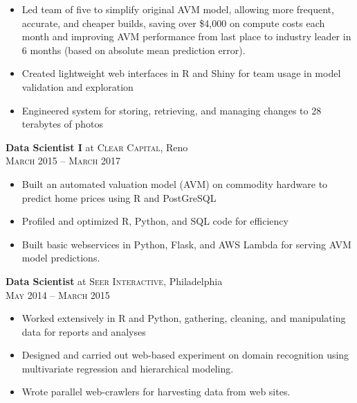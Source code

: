 \documentclass[a4paper,10pt]{article}
\begin{document}
\vspace{-5mm}
\small 
\begin{itemize}
    \item Led team of five to simplify original AVM model, allowing more frequent, accurate, and cheaper builds, saving over \$4,000 on compute costs each month and improving AVM performance from last place to industry leader in 6 months (based on absolute mean prediction error).
    \item Created lightweight web interfaces in R and Shiny for team usage in model validation and exploration
    \item Engineered system for storing, retrieving, and managing changes to 28 terabytes of photos
\end{itemize}

\textbf{Data Scientist I} at \textsc{Clear Capital}, Reno \\
\textsc{March 2015} -- \textsc{March 2017} \\

\vspace{-5mm}
\small
\begin{itemize}
\item Built an automated valuation model (AVM) on commodity hardware to predict home prices using R and PostGreSQL
\item Profiled and optimized R, Python, and SQL code for efficiency
\item Built basic webservices in Python, Flask, and AWS Lambda for serving AVM model predictions.
\end{itemize}

\textbf{Data Scientist} at \textsc{Seer Interactive}, Philadelphia \\ 
\textsc{May 2014} -- \textsc{March 2015} \\

\vspace{-5mm}
\small
\begin{itemize}
\item Worked extensively in R and Python, gathering, cleaning, and manipulating data for reports and analyses
\item Designed and carried out web-based experiment on domain recognition using multivariate regression and hierarchical modeling.
\item Wrote parallel web-crawlers for harvesting data from web sites.
\end{itemize}

\vspace{5mm}
\end{document}
